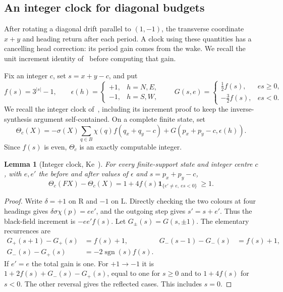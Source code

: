 \documentclass[11pt]{article}
\newtheorem{lemma}[theorem]{Lemma}
\theoremstyle{definition}\newtheorem{definition}[theorem]{Definition}
\newcommand{\R}{\mathrm R}
\newcommand{\Lturn}{\mathrm L}
\DeclareMathOperator{\sgn}{sgn}
\newcommand{\ind}{\mathbf1}
\begin{document}
\subsection{An integer clock for diagonal budgets}
After rotating a diagonal drift parallel to $(1,-1)$, the transverse
coordinate $x+y$ and heading return after each period. A clock using these
quantities has a cancelling
head correction: its period gain comes from the wake. We recall the unit
increment identity of~\cite{clock} before computing that gain.

Fix an integer $c$, set $s=x+y-c$, and put
\[
 f(s)=3^{|s|}-1,\qquad
 \epsilon(h)=\begin{cases}+1,&h=N,E,\\-1,&h=S,W,\end{cases}\qquad
 G(s,e)=\begin{cases}\tfrac12 f(s),&es\ge0,\\-\tfrac32 f(s),&es<0.\end{cases}
\]
We recall the integer clock of~\cite{clock}, including its increment proof
to keep the inverse-synthesis argument self-contained. On a complete finite state, set
\begin{equation}\label{eq:integer}
 \Theta_c(X)=-\sigma(X)\sum_{q\in B}\chi(q)f(q_x+q_y-c)
             +G(p_x+p_y-c,\epsilon(h)).
\end{equation}
Since $f(s)$ is even, $\Theta_c$ is an exactly computable integer.

\begin{lemma}[Integer clock, Ke~\cite{clock}]\label{thm:clock}
For every finite-support state and integer centre $c$, with $e,e'$ the before
and after values of $\epsilon$ and $s=p_x+p_y-c$,
\begin{equation}\label{eq:gain}
 \Theta_c(FX)-\Theta_c(X)
   =1+4f(s)\ind_{\{e'\ne e,\ es<0\}}\ \ge1.
\end{equation}
\end{lemma}
\begin{proof}
Write $\delta=+1$ on $\R$ and $-1$ on $\Lturn$. Directly checking the two colours
at four headings gives $\delta\sigma\chi(p)=ee'$, and the outgoing step gives
$s'=s+e'$. Thus the black-field increment is $-ee'f(s)$. Let $G_\pm(s)=G(s,\pm1)$.
The elementary recurrences are
\begin{align*}
 G_+(s+1)-G_+(s)&=f(s)+1,&G_-(s-1)-G_-(s)&=f(s)+1,\\
 G_-(s)-G_+(s)&=-2\sgn(s)f(s).
\end{align*}
If $e'=e$ the total gain is one. For $+1\to-1$ it is
$1+2f(s)+G_-(s)-G_+(s)$, equal to one for $s\ge0$ and to $1+4f(s)$ for $s<0$.
The other reversal gives the reflected cases. This includes $s=0$.
\end{proof}
\end{document}
